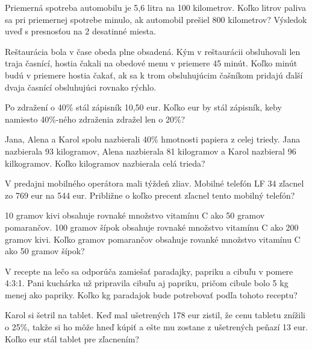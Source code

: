 \begin{example}
	Priemerná spotreba automobilu je 5,6 litra na 100 kilometrov. Koľko litrov paliva sa pri priemernej spotrebe minulo, ak automobil prešiel 800 kilometrov? Výsledok uveď s presnosťou na 2 desatinné miesta.
\end{example}

\begin{example}
	Reštaurácia bola v čase obeda plne obsadená. Kým v reštaurácii obsluhovali len traja časnící, hostia čakali na obedové menu v priemere 45 minút. Koľko minút budú v priemere hostia čakať, ak sa k trom obsluhujúcim čašníkom pridajú ďalší dvaja časnící obsluhujúci rovnako rýchlo.
\end{example}

\begin{example}
	Po zdražení o 40\% stál zápisník 10,50 eur. Koľko eur by stál zápisník, keby namiesto 40\%-ného zdraženia zdražel len o 20\%?
\end{example}

\begin{example}
	Jana, Alena a Karol spolu nazbierali 40\% hmotnosti papiera z celej triedy. Jana nazbierala 93 kilogramov, Alena nazbierala 81 kilogramov a Karol nazbieral 96 kilkogramov. Koľko kilogramov nazbierala celá trieda?  
\end{example}

\begin{example}
	V predajni mobilného operátora mali týždeň zliav. Mobilné telefón LF 34 zľacnel zo 769 eur na 544 eur. Približne o koľko precent zľacnel tento mobilný telefón?
\end{example}

\begin{example}
	10 gramov kivi obsahuje rovnaké množstvo vitamínu C ako 50 gramov pomarančov. 100 gramov šípok obsahuje rovnaké množstvo vitamínu C ako 200 gramov kivi. Koľko gramov pomarančov obsahuje rovanké množstvo vitamínu C ako 50 gramov šípok?
\end{example}

\begin{example}
	V recepte na lečo sa odporúča zamiešať paradajky, papriku a cibuľu v pomere 4:3:1. Pani kuchárka už pripravila cibuľu aj papriku, pričom cibule bolo 5 kg menej ako papriky. Koľko kg paradajok bude potrebovať podľa tohoto receptu?
\end{example}

\begin{example}
	Karol si šetril na tablet. Keď mal ušetrených 178 eur zistil, že cenu tabletu znížili o 25\%, takže si ho môže hneď kúpiť a ešte mu zostane z ušetrených peňazí 13 eur. Koľko eur stál tablet pre zľacnením?
\end{example}

